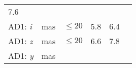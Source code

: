 \documentclass[DM, lsstdraft, toc]{lsstdoc}
\begin{document}
\begin{longtable}[]{@{}llllll@{}}
\begin{minipage}[t]{0.12\columnwidth}
7.6\strut
\end{minipage} & \begin{minipage}[t]{0.17\columnwidth}\raggedright\strut
\strut
\end{minipage}\tabularnewline
\begin{minipage}[t]{0.12\columnwidth}\raggedright\strut
AD1: \emph{i}\strut
\end{minipage} & \begin{minipage}[t]{0.06\columnwidth}\raggedright\strut
mas\strut
\end{minipage} & \begin{minipage}[t]{0.14\columnwidth}\raggedright\strut
\(\leq 20\)\strut
\end{minipage} & \begin{minipage}[t]{0.12\columnwidth}\raggedright\strut
5.8\strut
\end{minipage} & \begin{minipage}[t]{0.12\columnwidth}\raggedright\strut
6.4\strut
\end{minipage} & \begin{minipage}[t]{0.17\columnwidth}\raggedright\strut
\strut
\end{minipage}\tabularnewline
\begin{minipage}[t]{0.12\columnwidth}\raggedright\strut
AD1: \emph{z}\strut
\end{minipage} & \begin{minipage}[t]{0.06\columnwidth}\raggedright\strut
mas\strut
\end{minipage} & \begin{minipage}[t]{0.14\columnwidth}\raggedright\strut
\(\leq 20\)\strut
\end{minipage} & \begin{minipage}[t]{0.12\columnwidth}\raggedright\strut
6.6\strut
\end{minipage} & \begin{minipage}[t]{0.12\columnwidth}\raggedright\strut
7.8\strut
\end{minipage} & \begin{minipage}[t]{0.17\columnwidth}\raggedright\strut
\strut
\end{minipage}\tabularnewline
\begin{minipage}[t]{0.12\columnwidth}\raggedright\strut
AD1: \emph{y}\strut
\end{minipage} & \begin{minipage}[t]{0.06\columnwidth}\raggedright\strut
mas\strut
\end{minipage} & \begin{minipage}[t]{0.14\columnwidth}\raggedright\strut

\end{minipage}
\end{longtable}
\end{document}
